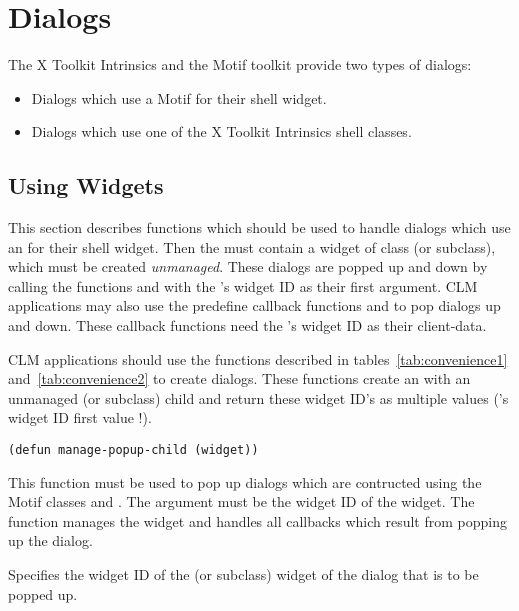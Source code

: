 \section{Dialogs}\label{sec:dialogs}

The X Toolkit Intrinsics and the Motif toolkit provide two types of dialogs:

\begin{itemize}
\item Dialogs which use a Motif  for their shell widget.
\item Dialogs which use one of the X Toolkit Intrinsics shell classes.
\end{itemize}

\subsection{Using  Widgets}\label{sec:xmdialogs}

This section describes functions which should be used to handle dialogs which
use an  for their shell widget.  Then the
 must contain a widget of class 
(or subclass), which must be created {\em unmanaged}.  These dialogs are popped
up and down by calling the functions  and
 with the 's widget ID as
their first argument.  CLM applications may also use the predefine callback
functions  and  to pop dialogs up and
down.  These callback functions need the 's widget ID as
their client-data. 

CLM applications should use the  functions described in
tables~\ref{tab:convenience1} and~\ref{tab:convenience2} to create dialogs. 
These functions create an  with an unmanaged
 (or subclass) child and return these widget ID's as
multiple values ('s widget ID first value !). 

\begin{lispd}
\syntax\begin{verbatim}
(defun manage-popup-child (widget))
\end{verbatim}
\beschr This function must be used to pop up dialogs which are contructed using
the Motif classes  and .  The
 argument must be the widget ID of the 
widget.  The function manages the  widget and handles all
callbacks which result from popping up the dialog. 
\parameter
\begin{paramd}
 Specifies the widget ID of the 
(or subclass) widget of the dialog that is to be popped up.
\end{paramd}
\end{lispd}

